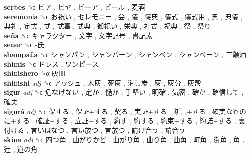 \textbf{serbes} ␝ϲ   ビア ,  ビヤ ,  ビーア ,  ビール ,  麦酒   \\
\textbf{seremonia} ␝ϲ   お祝い ,  セレモニー ,  会 ,  儀 ,  儀典 ,  儀式 ,  儀式用 ,  典 ,  典儀 ,  典礼 ,  定式 ,  式 ,  式事 ,  式典 ,  御祝い ,  栄典 ,  礼式 ,  祝典 ,  祭 ,  祭り   \\
\textbf{seña} ␝ϲ   キャラクター ,  文字 ,  文字記号 ,  書記素   \\
\textbf{señor} ␝ϲ   -氏   \\
\textbf{shampaña} ␝ϲ   シャンパン ,  シャンパーン ,  シャンペン ,  シャンペーン ,  三鞭酒   \\
\textbf{shimis} ␝ϲ   ドレス ,  ワンピース   \\
\textbf{shinishero} ␝α   灰皿   \\
\textbf{shinishi} \emph{adj}  ␝ϲ   アッシュ ,  木灰 ,  死灰 ,  消し炭 ,  灰 ,  灰分 ,  灰殻   \\
\textbf{sigur} \emph{adj}  ␝ϲ   危なげない ,  定か ,  慥か ,  手堅い ,  明確 ,  気密 ,  確か ,  確信して ,  確実   \\
\textbf{sigurá} \emph{adj}  ␝ϲ   保する ,  保証+する ,  契る ,  実証+する ,  断言+する ,  確実なものに+する ,  確証+する ,  立証+する ,  約す ,  約する ,  約束+する ,  約諾+する ,  裏付ける ,  言いはなつ ,  言い放つ ,  言放つ ,  請け合う ,  請合う   \\
\textbf{skina} \emph{adj}  ␝ϲ   四つ角 ,  曲がりかど ,  曲がり角 ,  曲り角 ,  曲角 ,  町角 ,  街角 ,  角 ,  辻 ,  道の角   \\
